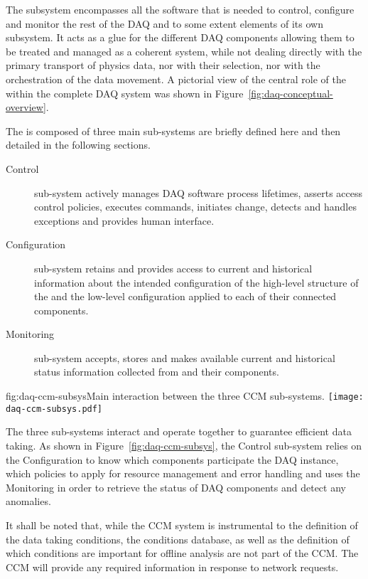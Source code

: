The  subsystem encompasses all the software that is needed to control, configure and monitor the rest of the DAQ and to some extent elements of its own subsystem. 
It acts as a glue for the different DAQ components allowing them to be treated and managed as a coherent system, while not dealing directly with the primary transport of physics data, nor with their selection, nor with the orchestration of the data movement. 
A pictorial view of the central role of the  within the complete DAQ system was shown in Figure~\ref{fig:daq-conceptual-overview}.

The  is composed of three main sub-systems are briefly defined here and then detailed in the following sections.
\begin{description}

\item[Control] sub-system actively manages DAQ software process lifetimes, asserts access control policies, executes commands, initiates change, detects and handles exceptions and provides human interface.


\item[Configuration] sub-system retains and provides access to current and historical information about the intended configuration of the high-level structure of the  and the low-level configuration applied to each of their connected components.

\item[Monitoring] sub-system accepts, stores and makes available current and historical status information collected from  and their components.

\end{description}

\begin{dunefigure}{fig:daq-ccm-subsys}{Main interaction between the three CCM sub-systems.}
  \texttt{[image: daq-ccm-subsys.pdf]}
\end{dunefigure}

The three  sub-systems interact and operate together to guarantee efficient data taking.  As shown in Figure~\ref{fig:daq-ccm-subsys}, the Control sub-system relies on the Configuration to know which components participate the DAQ instance, which policies to apply for resource management and error handling and uses the Monitoring in order to retrieve the status of DAQ components and detect any anomalies.

It shall be noted that, while the CCM system is instrumental to the definition of the data taking conditions, the conditions database, as well as the definition of which conditions are important for offline analysis are not part of the CCM. The CCM will provide any required information in response to network requests.


